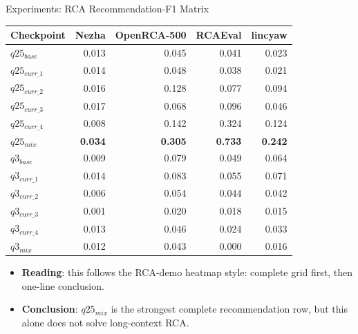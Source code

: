 \begin{frame}{Experiments: RCA Recommendation-F1 Matrix}
  \tiny
  \begin{table}
    \begin{tabular}{lrrrr}
      \toprule
      Checkpoint & Nezha & OpenRCA-500 & RCAEval & lincyaw \\
      \midrule
      $q25_{base}$ & 0.013 & 0.045 & 0.041 & 0.023 \\
      $q25_{curr\_1}$ & 0.014 & 0.048 & 0.038 & 0.021 \\
      $q25_{curr\_2}$ & 0.016 & 0.128 & 0.077 & 0.094 \\
      $q25_{curr\_3}$ & 0.017 & 0.068 & 0.096 & 0.046 \\
      $q25_{curr\_4}$ & 0.008 & 0.142 & 0.324 & 0.124 \\
      $q25_{mix}$ & \textbf{0.034} & \textbf{0.305} & \textbf{0.733} & \textbf{0.242} \\
      $q3_{base}$ & 0.009 & 0.079 & 0.049 & 0.064 \\
      $q3_{curr\_1}$ & 0.014 & 0.083 & 0.055 & 0.071 \\
      $q3_{curr\_2}$ & 0.006 & 0.054 & 0.044 & 0.042 \\
      $q3_{curr\_3}$ & 0.001 & 0.020 & 0.018 & 0.015 \\
      $q3_{curr\_4}$ & 0.013 & 0.046 & 0.024 & 0.033 \\
      $q3_{mix}$ & 0.012 & 0.043 & 0.000 & 0.016 \\
      \bottomrule
    \end{tabular}
  \end{table}
  \normalsize
  \vspace{-0.4em}
  \begin{itemize}
    \item \textbf{Reading}: this follows the RCA-demo heatmap style: complete grid first, then one-line conclusion.
    \item \textbf{Conclusion}: $q25_{mix}$ is the strongest complete recommendation row, but this alone does not solve long-context RCA.
  \end{itemize}
\end{frame}

